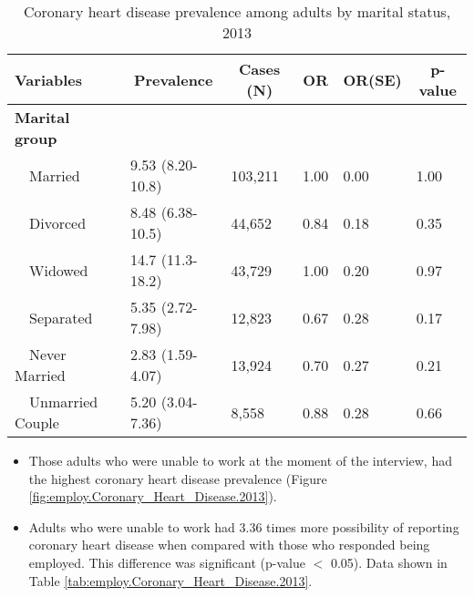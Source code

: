 \begin{table}[H]
\caption{Coronary heart disease prevalence  among adults by marital status, 2013\label{tab:marital.Coronary_Heart_Disease.2013}} 
\begin{center}
\begin{tabular}{llllll}
\hline\hline
\multicolumn{1}{l}{Variables}&\multicolumn{1}{c}{Prevalence}&\multicolumn{1}{c}{Cases (N)}&\multicolumn{1}{c}{OR}&\multicolumn{1}{c}{OR(SE)}&\multicolumn{1}{c}{p-value}\tabularnewline
\hline
{\bfseries Marital group}&&&&&\tabularnewline
~~Married&9.53 (8.20-10.8)&103,211&1.00&0.00&1.00\tabularnewline
~~Divorced&8.48 (6.38-10.5)& 44,652&0.84&0.18&0.35\tabularnewline
~~Widowed&14.7 (11.3-18.2)& 43,729&1.00&0.20&0.97\tabularnewline
~~Separated&5.35 (2.72-7.98)& 12,823&0.67&0.28&0.17\tabularnewline
~~Never Married&2.83 (1.59-4.07)& 13,924&0.70&0.27&0.21\tabularnewline
~~Unmarried Couple&5.20 (3.04-7.36)&  8,558&0.88&0.28&0.66\tabularnewline
\hline
\end{tabular}\end{center}

\end{table}

 
 \newpage
\begin{itemize}


\item Those adults who were 
unable to work at the moment of the interview, had the highest coronary heart disease prevalence (Figure \ref{fig:employ.Coronary_Heart_Disease.2013}).

\item Adults who were unable to work had 3.36 times more possibility of reporting coronary heart disease when compared with those who responded being employed. This difference was significant (p-value $<$ 0.05). 
Data shown in Table \ref{tab:employ.Coronary_Heart_Disease.2013}.


\end{itemize}

